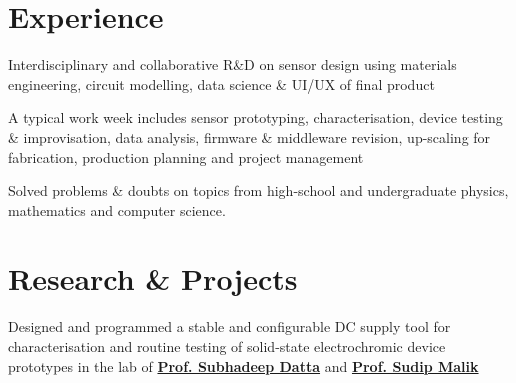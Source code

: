 \documentclass[]{psyqe-resume-openfont}
\begin{document}
\hfill
\begin{minipage}[t]{0.65\textwidth} 


\section{Experience}

\vspace{\topsep} %
\begin{tightemize}
\item Interdisciplinary and collaborative R\&D on sensor design using materials  engineering, circuit modelling, data science \&  UI/UX of final product
\item A typical work week includes sensor prototyping, characterisation, device testing \& improvisation, data analysis, firmware \& middleware revision, up-scaling for fabrication, production planning and project management 
\end{tightemize}
\sectionsep

\begin{tightemize}
\item Solved problems \& doubts on topics from high-school and undergraduate physics, mathematics and computer science.
\end{tightemize}
\sectionsep



\section{Research \& Projects}
\begin{tightemize}
\item  Designed and programmed a stable and configurable DC supply tool for characterisation and routine testing of solid-state electrochromic device prototypes in the lab of \textbf{\href{http://iacs.res.in/faculty-profile.html?id=112}{Prof. Subhadeep Datta}} and \textbf{\href{http://iacs.res.in/faculty-profile.html?id=68}{Prof. Sudip Malik}}
\end{tightemize}
\sectionsep



\end{minipage}
\end{document}
